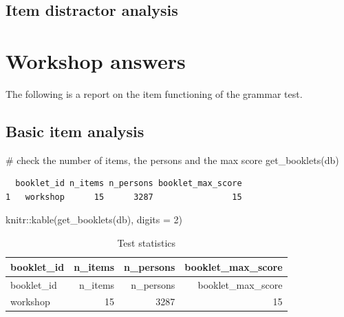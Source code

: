 \documentclass[
  letterpaper,
  DIV=11,
  numbers=noendperiod]{scrreprt}
\newenvironment{Shaded}{\begin{snugshade}}{\end{snugshade}}
\newcommand{\AttributeTok}[1]{\textcolor[rgb]{0.40,0.45,0.13}{#1}}
\newcommand{\CommentTok}[1]{\textcolor[rgb]{0.37,0.37,0.37}{#1}}
\newcommand{\DecValTok}[1]{\textcolor[rgb]{0.68,0.00,0.00}{#1}}
\newcommand{\FunctionTok}[1]{\textcolor[rgb]{0.28,0.35,0.67}{#1}}
\newcommand{\NormalTok}[1]{\textcolor[rgb]{0.00,0.23,0.31}{#1}}
\newcommand{\SpecialCharTok}[1]{\textcolor[rgb]{0.37,0.37,0.37}{#1}}
\begin{document}
\hypertarget{item-distractor-analysis}{%
\section{Item distractor analysis}\label{item-distractor-analysis}}

\hypertarget{workshop-answers}{%
\chapter{Workshop answers}\label{workshop-answers}}

The following is a report on the item functioning of the grammar test.

\hypertarget{basic-item-analysis}{%
\section{Basic item analysis}\label{basic-item-analysis}}

\begin{Shaded}
\begin{Highlighting}[]
\CommentTok{\# check the number of items, the persons and the max score}
\FunctionTok{get\_booklets}\NormalTok{(db)}
\end{Highlighting}
\end{Shaded}

\begin{verbatim}
  booklet_id n_items n_persons booklet_max_score
1   workshop      15      3287                15
\end{verbatim}

\begin{Shaded}
\begin{Highlighting}[]
\NormalTok{knitr}\SpecialCharTok{::}\FunctionTok{kable}\NormalTok{(}\FunctionTok{get\_booklets}\NormalTok{(db), }\AttributeTok{digits =} \DecValTok{2}\NormalTok{)}
\end{Highlighting}
\end{Shaded}

\hypertarget{tbl-test}{}
\begin{longtable}[]{@{}lrrr@{}}
\caption{\label{tbl-test}Test statistics}\tabularnewline
\toprule\noalign{}
booklet\_id & n\_items & n\_persons & booklet\_max\_score \\
\midrule\noalign{}
\endfirsthead
\toprule\noalign{}
booklet\_id & n\_items & n\_persons & booklet\_max\_score \\
\midrule\noalign{}
\endhead
\bottomrule\noalign{}
\endlastfoot
workshop & 15 & 3287 & 15 \\
\end{longtable}
\end{document}
